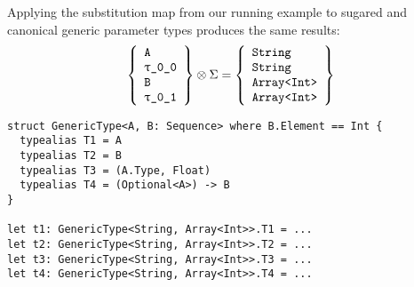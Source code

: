 \documentclass[../generics]{subfiles}
\begin{document}
\begin{example}
Applying the substitution map from our running example to sugared and canonical generic parameter types produces the same results:
\[
\left\{
\begin{array}{l}
\texttt{A}\\
\ttgp{0}{0}\\
\texttt{B}\\
\ttgp{0}{1}
\end{array}\right\}
\otimes
\Sigma
=
\left\{
\begin{array}{l}
\texttt{String}\\
\texttt{String}\\
\texttt{Array<Int>}\\
\texttt{Array<Int>}
\end{array}\right\}
\]
\end{example}
\begin{listing}\label{typealiassubstlisting}
\begin{Verbatim}
struct GenericType<A, B: Sequence> where B.Element == Int {
  typealias T1 = A
  typealias T2 = B
  typealias T3 = (A.Type, Float)
  typealias T4 = (Optional<A>) -> B
}

let t1: GenericType<String, Array<Int>>.T1 = ...
let t2: GenericType<String, Array<Int>>.T2 = ...
let t3: GenericType<String, Array<Int>>.T3 = ...
let t4: GenericType<String, Array<Int>>.T4 = ...
\end{Verbatim}
\end{listing}
\end{document}
